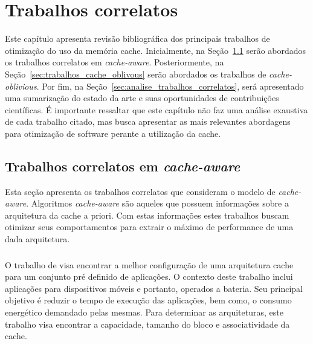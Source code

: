 \chapter{Trabalhos correlatos}
\label{cap:trabalhos_correlatos}

Este capítulo apresenta revisão bibliográfica dos principais trabalhos de otimização do uso da memória cache.
Inicialmente, na Seção~\ref{sec:trabalhos_cache_aware} serão abordados os trabalhos correlatos em \textit{cache-aware}.
Posteriormente, na Seção~\ref{sec:trabalhos_cache_oblivous} serão abordados os trabalhos de \textit{cache-oblivious}.
Por fim, na Seção~\ref{sec:analise_trabalhos_correlatos}, será apresentado uma sumarização do estado da arte e suas oportunidades de contribuições científicas.
É importante ressaltar que este capítulo não faz uma análise exaustiva de cada trabalho citado, mas busca apresentar as mais relevantes abordagens para otimização de software perante a utilização da cache.

\section{Trabalhos correlatos em \textit{cache-aware}}
\label{sec:trabalhos_cache_aware}

Esta seção apresenta os trabalhos correlatos que consideram o modelo de \textit{cache-aware}.
Algoritmos \textit{cache-aware} são aqueles que possuem informações sobre a arquitetura da cache a priori.
Com estas informações estes trabalhos buscam otimizar seus comportamentos para extrair o máximo de performance de uma dada arquitetura.

\subsection{}

O trabalho de  visa encontrar a melhor configuração de uma arquitetura cache para um conjunto pré definido de aplicações.
O contexto deste trabalho inclui aplicações para dispositivos móveis e portanto, operados a bateria.
Seu principal objetivo é reduzir o tempo de execução das aplicações, bem como, o consumo energético demandado pelas mesmas.
Para determinar as arquiteturas, este trabalho visa encontrar a capacidade, tamanho do bloco e associatividade da cache.

